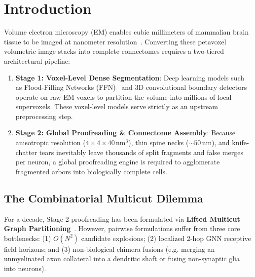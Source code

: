 \documentclass[10pt,twocolumn,letterpaper]{article}
\begin{document}
\section{Introduction}
Volume electron microscopy (EM) enables cubic millimeters of mammalian brain tissue to be imaged at nanometer resolution~\cite{microns2025,flywire2024,shapsoncoe2024}. Converting these petavoxel volumetric image stacks into complete connectomes requires a two-tiered architectural pipeline:
\begin{enumerate}
    \item \textbf{Stage 1: Voxel-Level Dense Segmentation}: Deep learning models such as Flood-Filling Networks (FFN)~\cite{januszewski2018} and 3D convolutional boundary detectors operate on raw EM voxels to partition the volume into millions of local supervoxels. These voxel-level models serve strictly as an upstream preprocessing step.
    \item \textbf{Stage 2: Global Proofreading \& Connectome Assembly}: Because anisotropic resolution ($4\times 4\times 40\,\text{nm}^3$), thin spine necks ($\sim 50\,\text{nm}$), and knife-chatter tears inevitably leave thousands of split fragments and false merges per neuron, a global proofreading engine is required to agglomerate fragmented arbors into biologically complete cells.
\end{enumerate}

\subsection{The Combinatorial Multicut Dilemma}
For a decade, Stage 2 proofreading has been formulated via \textbf{Lifted Multicut Graph Partitioning}~\cite{macrina2021,deepmulticut2024}. However, pairwise formulations suffer from three core bottlenecks: (1) $O(N^2)$ candidate explosions; (2) localized 2-hop GNN receptive field horizons; and (3) non-biological chimera fusions (e.g. merging an unmyelinated axon collateral into a dendritic shaft or fusing non-synaptic glia into neurons).
\end{document}
